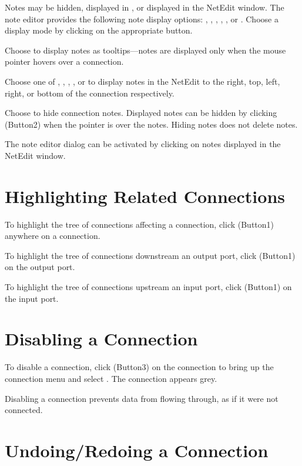 Notes may be hidden, displayed in , or displayed in the
NetEdit window.  The note editor provides the following note display
options: , , ,
, , or .  Choose a
display mode by clicking  on the appropriate button.

Choose  to display notes as tooltips---notes are
displayed only when the mouse pointer hovers over a connection.

Choose one of , , ,
, or  to display notes in the
NetEdit to the right, top, left, right, or bottom of the connection
respectively. 

Choose  to hide connection notes.  Displayed notes can be
hidden by clicking \keyboard(Button2) when the pointer is over the
notes.  Hiding notes does not delete notes.

The note editor dialog can be activated by clicking 
on notes displayed in the NetEdit window.

\section{Highlighting Related Connections}
\label{sec:highlightconnect}

To highlight the tree of connections affecting a connection, click
\keyboard(Button1) anywhere on a connection.

To highlight the tree of connections downstream an output port,
click \keyboard(Button1) on the output port.

To highlight the tree of connections upstream an input port,
click \keyboard(Button1) on the input port.

\section{Disabling a Connection}
\label{sec:disableconnect}

To disable a connection, click \keyboard(Button3) on the connection to
bring up the connection menu and select . The
connection appears grey.

Disabling a connection prevents data from flowing through, as if it were
not connected.

\section{Undoing/Redoing a Connection}
\label{sec:undomod}

